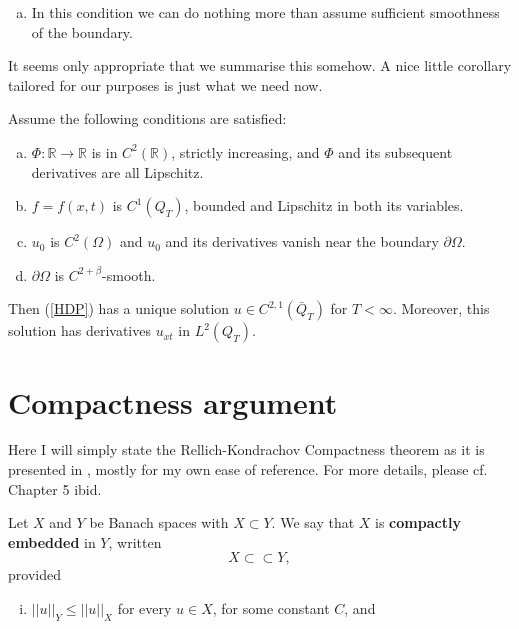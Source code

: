 \documentclass[11pt, a4paper]{article}
\begin{document}
\begin{appendices}
\begin{enumerate}[a)]
	\item In this condition we can do nothing more than assume sufficient smoothness of the boundary.
\end{enumerate}

It seems only appropriate that we summarise this somehow. A nice little corollary tailored for our purposes is just what we need now.

\begin{cor}
\label{cor:GPME_existence}
Assume the following conditions are satisfied:
	\begin{enumerate}[a)]
		\item 	$\Phi: \mathbb{R} \to \mathbb{R}$ is in $C^2(\mathbb{R})$, strictly increasing, and $\Phi$ and its subsequent derivatives are all Lipschitz.
		
		\item $f = f(x,t)$ is $C^1(Q_T)$, bounded and Lipschitz in both its variables.
		
		\item $u_0$ is $C^2(\Omega)$ and $u_0$ and its derivatives vanish near the boundary $\partial \Omega$.
		
		\item $\partial \Omega$ is $C^{2+\beta}$-smooth.
	
	\end{enumerate}
Then (\ref{HDP}) has a unique solution $u\in C^{2,1}(\bar{Q}_T)$ for $T<\infty$. Moreover, this solution has derivatives $u_{xt}$ in $L^2(Q_T)$.
\end{cor}



\newpage
\section{Compactness argument}
Here I will simply state the Rellich-Kondrachov Compactness theorem as it is presented in \citep{evans}, mostly for my own ease of reference. For more details, please cf. Chapter 5 ibid.

\begin{mydef}
Let $X$ and $Y$ be Banach spaces with $X \subset Y$. We say that $X$ is \textbf{compactly embedded} in $Y$, written
\begin{equation*}
X \subset \subset Y,
\end{equation*}
provided 
\begin{enumerate}[i)]
	\item $||u||_Y \leq ||u||_X$ for every $u \in X$, for some constant $C$, and


\end{enumerate}
\end{mydef}
\end{appendices}
\end{document}
